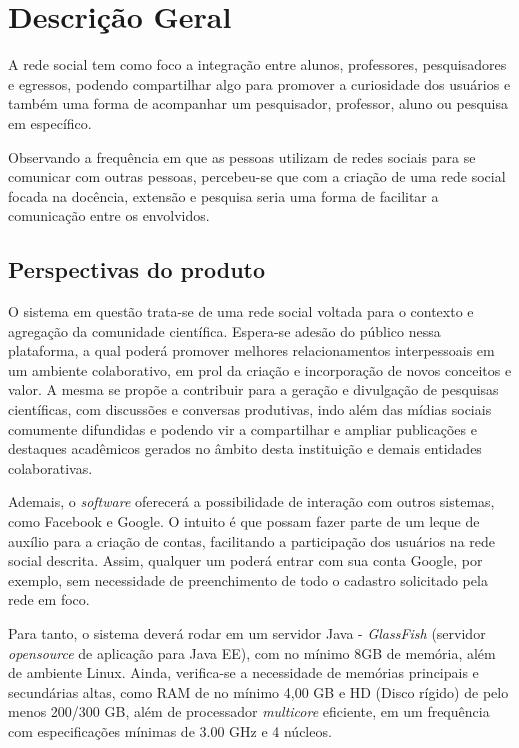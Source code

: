 \chapter{Descrição Geral}
A rede social tem como foco a integração entre alunos, professores, pesquisadores e egressos, 
podendo compartilhar algo para promover a curiosidade dos usuários e também uma forma de acompanhar um pesquisador, professor, aluno ou pesquisa em específico. 	

Observando a frequência em que as pessoas utilizam de redes sociais para se comunicar com outras pessoas, percebeu-se que com a criação de uma rede social focada na docência, extensão e pesquisa seria uma forma de facilitar a comunicação entre os envolvidos. 


\section{Perspectivas do produto}

O sistema em questão trata-se de uma rede social voltada para o contexto e agregação da comunidade científica. Espera-se adesão do público nessa plataforma, a qual poderá promover melhores relacionamentos interpessoais em um ambiente colaborativo, em prol da criação e incorporação de novos conceitos e valor. A mesma se propõe a contribuir para a geração e divulgação de pesquisas científicas, com discussões e conversas produtivas, indo além das mídias sociais comumente difundidas e podendo vir a compartilhar e ampliar publicações e destaques acadêmicos gerados no âmbito desta instituição e demais entidades colaborativas.

Ademais, o \textit{software} oferecerá a possibilidade de interação com outros sistemas, como Facebook e Google. O intuito é que possam fazer parte de um leque de auxílio para a criação de contas, facilitando a participação dos usuários na rede social descrita. Assim, qualquer um poderá entrar com sua conta Google, por exemplo, sem necessidade de preenchimento de todo o cadastro solicitado pela rede em foco.

Para tanto, o sistema deverá rodar em um servidor Java - \textit{GlassFish} (servidor \textit{opensource} de aplicação para Java EE), com no mínimo 8GB de memória, além de ambiente Linux. Ainda, verifica-se a necessidade de memórias principais e secundárias altas, como RAM de no mínimo 4,00 GB e HD (Disco rígido) de pelo menos 200/300 GB, além de processador \textit{multicore} eficiente, em um frequência com especificações mínimas de 3.00 GHz e 4 núcleos. 


